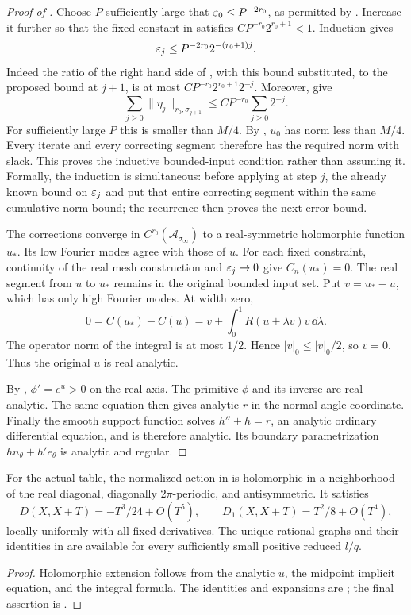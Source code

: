 \begin{proof}[Proof of ]
Choose \(P\) sufficiently large that
\(\varepsilon_0\le P^{-2r_0}\), as permitted by
.  Increase it further so that the fixed
constant in  satisfies
\(CP^{-r_0}2^{r_0+1}<1\).  Induction gives
\begin{equation}\label{ana:newton-decay}
\varepsilon_j\le P^{-2r_0}2^{-(r_0+1)j}.
\end{equation}
Indeed the ratio of the right hand side of
, with this bound substituted, to the
proposed bound at \(j+1\), is at most
\(CP^{-r_0}2^{r_0+1}2^{-j}\).
Moreover,  give
\[
\sum_{j\ge0}\|\eta_j\|_{r_0,\sigma_{j+1}}
\le CP^{-r_0}\sum_{j\ge0}2^{-j}.
\]
For sufficiently large \(P\) this is smaller than \(M/4\).
By , \(u_0\) has norm less than \(M/4\).
Every iterate and every correcting segment therefore has the required
norm with slack.  This proves the inductive bounded-input condition
rather than assuming it.
Formally, the induction is simultaneous: before applying
 at step \(j\), the already known bound
on \(\varepsilon_j\) and  put that entire
correcting segment within the same cumulative norm bound; the
recurrence then proves the next error bound.

The corrections converge in \(C^{r_0}(\mathcal A_{\sigma_\infty})\)
to a real-symmetric holomorphic function \(u_*\).
Its low Fourier modes agree with those of \(u\).  For each fixed
constraint, continuity of the real mesh construction and
\(\varepsilon_j\to0\) give \(C_n(u_*)=0\).
The real segment from \(u\) to \(u_*\) remains in the original bounded
input set.  Put \(v=u_*-u\), which has only high Fourier modes.
At width zero,
\[
0=C(u_*)-C(u)
=v+\int_0^1R(u+\lambda v)v\,\dd\lambda .
\]
The operator norm of the integral is at most \(1/2\).  Hence
\(|v|_0\le|v|_0/2\), so \(v=0\).
Thus the original \(u\) is real analytic.

By , \(\phi'=e^u>0\) on the real axis.
The primitive \(\phi\) and its inverse are real analytic.
The same equation then gives analytic \(r\) in the normal-angle
coordinate.  Finally the smooth support function solves
\(h''+h=r\), an analytic ordinary differential equation, and is
therefore analytic.  Its boundary parametrization
\(h n_\theta+h'e_\theta\) is analytic and regular.
\end{proof}

\begin{corollary}\label{ana:analytic-action-interface}
For the actual table, the normalized action in
 is holomorphic in a neighborhood of the
real diagonal, diagonally \(2\pi\)-periodic, and antisymmetric.
It satisfies
\[
D(X,X+T)=-T^3/24+O(T^5),\qquad
D_1(X,X+T)=T^2/8+O(T^4),
\]
locally uniformly with all fixed derivatives.  The unique rational
graphs and their identities in 
are available for every sufficiently small positive reduced \(l/q\).
\end{corollary}

\begin{proof}
Holomorphic extension follows from the analytic \(u\), the midpoint
implicit equation, and the integral formula.
The identities and expansions are
;
the final assertion is .
\end{proof}
